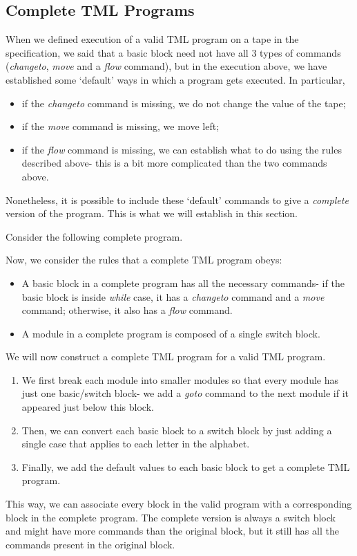 \begin{appendices}
\section{Complete TML Programs}
When we defined execution of a valid TML program on a tape in the specification, we said that a basic block need not have all 3 types of commands (\textit{changeto}, \textit{move} and a \textit{flow} command), but in the execution above, we have established some `default' ways in which a program gets executed. In particular,
\begin{itemize}
    \item if the \textit{changeto} command is missing, we do not change the value of the tape;
    \item if the \textit{move} command is missing, we move left;
    \item if the \textit{flow} command is missing, we can establish what to do using the rules described above- this is a bit more complicated than the two commands above.
\end{itemize}
Nonetheless, it is possible to include these `default' commands to give a \emph{complete} version of the program. This is what we will establish in this section. 

Consider the following complete program.

Now, we consider the rules that a complete TML program obeys:
\begin{itemize}
    \item A basic block in a complete program has all the necessary commands- if the basic block is inside \textit{while} case, it has a \textit{changeto} command and a \textit{move} command; otherwise, it also has a \textit{flow} command.
    \item A module in a complete program is composed of a single switch block.
\end{itemize}

We will now construct a complete TML program for a valid TML program.
\begin{enumerate}
    \item We first break each module into smaller modules so that every module has just one basic/switch block- we add a \textit{goto} command to the next module if it appeared just below this block.
    \item Then, we can convert each basic block to a switch block by just adding a single case that applies to each letter in the alphabet.
    \item Finally, we add the default values to each basic block to get a complete TML program.
\end{enumerate}
This way, we can associate every block in the valid program with a corresponding block in the complete program. The complete version is always a switch block and might have more commands than the original block, but it still has all the commands present in the original block. 


\end{appendices}

